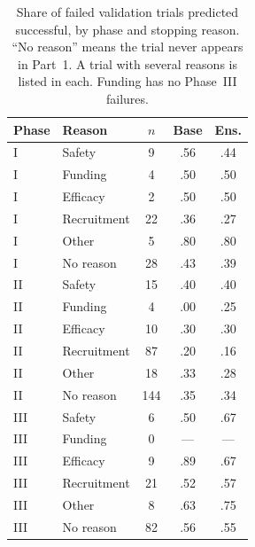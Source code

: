 \begin{table}[t]
\centering\small
\setlength{\tabcolsep}{3pt}
\begin{tabular*}{\columnwidth}{@{\extracolsep{\fill}}llccc@{}}
\toprule
Phase & Reason & $n$ & Base & Ens. \\
\midrule
I & Safety & 9 & .56 & .44 \\
I & Funding & 4 & .50 & .50 \\
I & Efficacy & 2 & .50 & .50 \\
I & Recruitment & 22 & .36 & .27 \\
I & Other & 5 & .80 & .80 \\
I & No reason & 28 & .43 & .39 \\
II & Safety & 15 & .40 & .40 \\
II & Funding & 4 & .00 & .25 \\
II & Efficacy & 10 & .30 & .30 \\
II & Recruitment & 87 & .20 & .16 \\
II & Other & 18 & .33 & .28 \\
II & No reason & 144 & .35 & .34 \\
III & Safety & 6 & .50 & .67 \\
III & Funding & 0 & --- & --- \\
III & Efficacy & 9 & .89 & .67 \\
III & Recruitment & 21 & .52 & .57 \\
III & Other & 8 & .63 & .75 \\
III & No reason & 82 & .56 & .55 \\
\bottomrule
\end{tabular*}
\caption{Share of failed validation trials predicted successful, by phase and
stopping reason. ``No reason'' means the trial never appears in Part~1.
A trial with several reasons is listed in each. Funding has no Phase~III
failures.}
\label{tab:p2err}
\end{table}
